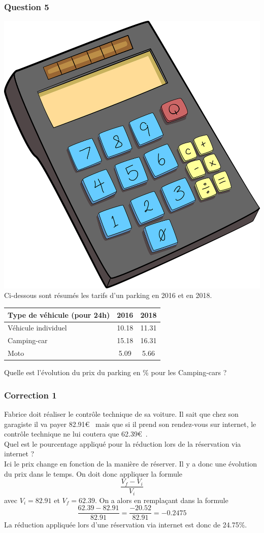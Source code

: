 \documentclass[15pt, mathserif]{beamer}
\begin{document}
\begin{frame} 
	\frametitle{Question 5}
\includegraphics[scale=0.01]{calculatrice}Ci-dessous sont résumés les tarifs d'un parking en 2016 et en 2018. 
 \begin{center} 
 \begin{tabular}{|C{3cm}|c|c|} 
 \hline 
 Type de véhicule (pour 24h) & 2016 & 2018 \\ 
 \hline 
 Véhicule individuel & 10.18& 11.31\\ 
 \hline 
 Camping-car & 15.18& 16.31\\ 
 \hline 
 Moto & 5.09& 5.66\\ 
 \hline 
 \end{tabular} 
\end{center} 
  Quelle est l'évolution du prix du parking en \% pour les Camping-cars ?\end{frame}


\begin{frame}
\vspace{-10mm}
	\frametitle{Correction 1}
\vspace*{1cm} {\small Fabrice doit réaliser le contrôle technique de sa voiture. Il sait que chez son garagiste il va payer 82.91\euro ~ mais que si il prend son rendez-vous sur internet, le contrôle technique ne lui coutera que  62.39\euro ~. \\ Quel est le pourcentage appliqué pour la réduction lors de la réservation via internet ? \\ Ici le prix change en fonction de la manière de réserver. Il y a donc une évolution du prix dans le temps. On doit donc appliquer la formule } $$\dfrac{V_f-V_i}{V_i}$$ avec $V_i =82.91$ et $V_f=62.39$. {\small On a alors en remplaçant dans la formule } $$\dfrac{62.39-82.91}{82.91}= \dfrac{-20.52}{82.91}=-0.2475$$ {\small La réduction appliquée lors d'une réservation via internet est donc de 24.75\%.}\end{frame}
\end{document}
